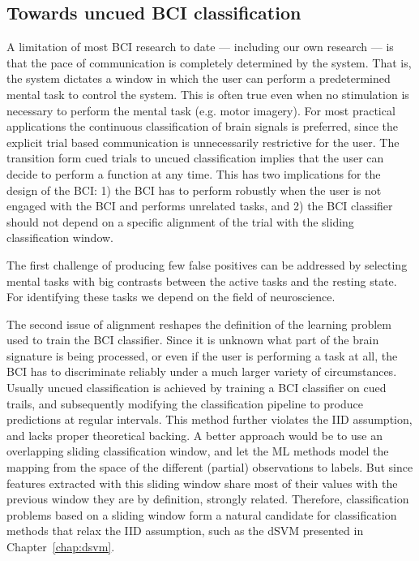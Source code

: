 \subsection{Towards uncued BCI classification}
A limitation of most \ac{BCI} research to date --- including our own research
--- is that the pace of communication is completely determined by the system.
That is, the system dictates a window in which the user can perform a
predetermined mental task to control the system. This is often true even when
no stimulation is necessary to perform the mental task (e.g. motor imagery).
%
For most practical applications the continuous classification of brain signals
is preferred, since the explicit trial based communication is unnecessarily
restrictive for the user. The transition form cued trials to uncued
classification implies that the user can decide to perform a function at any
time. This has two implications for the design of the \ac{BCI}: 1) the \ac{BCI}
has to perform robustly when the user is not engaged with the \ac{BCI} and
performs unrelated tasks, and 2) the \ac{BCI} classifier should not depend on a
specific alignment of the trial with the sliding classification window. 

The first challenge of producing few false positives can be addressed by 
selecting mental tasks with big contrasts between the active tasks and the
resting state. For identifying these tasks we depend on the field of
neuroscience.

The second issue of alignment reshapes the definition of the learning problem
used to train the \ac{BCI} classifier. Since it is unknown what part of the
brain signature is being processed, or even if the user is performing a task at
all, the \ac{BCI} has to discriminate reliably under a much larger variety of
circumstances.
%
Usually uncued classification is achieved by training a \ac{BCI} classifier
on cued trails, and subsequently modifying the classification pipeline
to produce predictions at regular intervals. This method further violates the
\ac{IID} assumption, and lacks proper theoretical backing.
%
A better approach would be to use an overlapping sliding classification window,
and let the \ac{ML} methods model the mapping from the space of the different
(partial) observations to labels. But since features extracted with this
sliding window share most of their values with the previous window they are by
definition, strongly related. Therefore, classification problems based
on a sliding window form a natural candidate for classification methods that
relax the \ac{IID} assumption, such as the \ac{dSVM} presented in
Chapter~\ref{chap:dsvm}.


